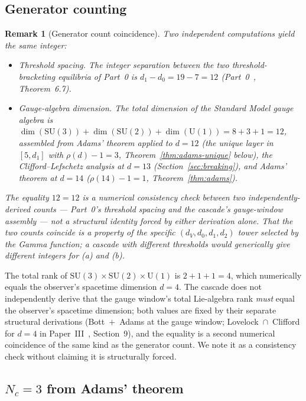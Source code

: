 \documentclass[12pt,a4paper]{article}
\newtheorem{remark}[theorem]{Remark}
\begin{document}
\subsection{Generator counting}

\begin{remark}[Generator count coincidence]\label{thm:generators}
Two independent computations yield the same integer:
\begin{itemize}
\item[(a)] \emph{Threshold spacing.} The integer separation between the
two threshold-bracketing equilibria of Part~0 is
$d_1 - d_0 = 19 - 7 = 12$ (Part~0~\cite{part0}, Theorem~6.7).
\item[(b)] \emph{Gauge-algebra dimension.} The total dimension of the
Standard Model gauge algebra is
$\dim(\mathrm{SU}(3)) + \dim(\mathrm{SU}(2)) + \dim(\mathrm{U}(1)) =
8 + 3 + 1 = 12$, assembled from Adams' theorem applied to $d=12$ (the
unique layer in $[5,d_1]$ with $\rho(d)-1=3$, Theorem~\ref{thm:adams-unique}
below), the Clifford--Lefschetz analysis at $d=13$ (Section~\ref{sec:breaking}),
and Adams' theorem at $d=14$ ($\rho(14)-1=1$, Theorem~\ref{thm:adams}).
\end{itemize}
The equality $12 = 12$ is a \emph{numerical consistency check} between
two independently-derived counts --- Part~0's threshold spacing and the
cascade's gauge-window assembly --- not a structural identity forced by
either derivation alone. That the two counts coincide is a property of
the specific $(d_V,d_0,d_1,d_2)$ tower selected by the Gamma function; a
cascade with different thresholds would generically give different
integers for (a) and (b).
\end{remark}

The total rank of $\mathrm{SU}(3)\times\mathrm{SU}(2)\times\mathrm{U}(1)$
is $2+1+1=4$, which numerically equals the observer's spacetime dimension
$d=4$. The cascade does not independently derive that the gauge window's
total Lie-algebra rank \emph{must} equal the observer's spacetime
dimension; both values are fixed by their separate structural derivations
(Bott~$+$~Adams at the gauge window; Lovelock~$\cap$~Clifford for $d=4$
in Paper~III~\cite{part3}, Section~9), and the equality is a second
numerical coincidence of the same kind as the generator count. We note it
as a consistency check without claiming it is structurally forced.

\subsection{\texorpdfstring{$N_c=3$}{N\_c=3} from Adams' theorem}
\end{document}
